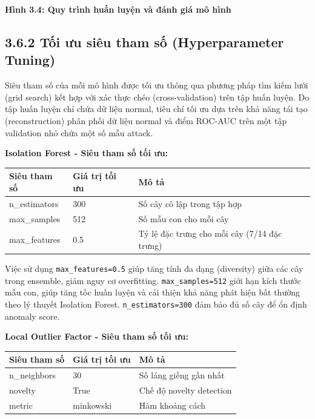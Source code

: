\documentclass[
  a4paper]{report}
\newcounter{none} %
\begin{document}
\textbf{Hình 3.4: Quy trình huấn luyện và đánh giá mô hình}

\subsection{3.6.2 Tối ưu siêu tham số (Hyperparameter
Tuning)}\label{tux1ed1i-ux1b0u-siuxeau-tham-sux1ed1-hyperparameter-tuning}

Siêu tham số của mỗi mô hình được tối ưu thông qua phương pháp tìm kiếm
lưới (grid search) kết hợp với xác thực chéo (cross-validation) trên tập
huấn luyện. Do tập huấn luyện chỉ chứa dữ liệu normal, tiêu chí tối ưu
dựa trên khả năng tái tạo (reconstruction) phân phối dữ liệu normal và
điểm ROC-AUC trên một tập validation nhỏ chứa một số mẫu attack.

\textbf{Isolation Forest - Siêu tham số tối ưu:}

{\def\LTcaptype{none} %
\begin{longtable}[]{@{}lll@{}}
\toprule\noalign{}
Siêu tham số & Giá trị tối ưu & Mô tả \\
\midrule\noalign{}
\endhead
\bottomrule\noalign{}
\endlastfoot
n\_estimators & 300 & Số cây cô lập trong tập hợp \\
max\_samples & 512 & Số mẫu con cho mỗi cây \\
max\_features & 0.5 & Tỷ lệ đặc trưng cho mỗi cây (7/14 đặc trưng) \\
\end{longtable}
}

Việc sử dụng \texttt{max\_features=0.5} giúp tăng tính đa dạng
(diversity) giữa các cây trong ensemble, giảm nguy cơ overfitting.
\texttt{max\_samples=512} giới hạn kích thước mẫu con, giúp tăng tốc
huấn luyện và cải thiện khả năng phát hiện bất thường theo lý thuyết
Isolation Forest. \texttt{n\_estimators=300} đảm bảo đủ số cây để ổn
định anomaly score.

\textbf{Local Outlier Factor - Siêu tham số tối ưu:}

{\def\LTcaptype{none} %
\begin{longtable}[]{@{}lll@{}}
\toprule\noalign{}
Siêu tham số & Giá trị tối ưu & Mô tả \\
\midrule\noalign{}
\endhead
\bottomrule\noalign{}
\endlastfoot
n\_neighbors & 30 & Số láng giềng gần nhất \\
novelty & True & Chế độ novelty detection \\
metric & minkowski & Hàm khoảng cách \\
\end{longtable}
}
\end{document}
